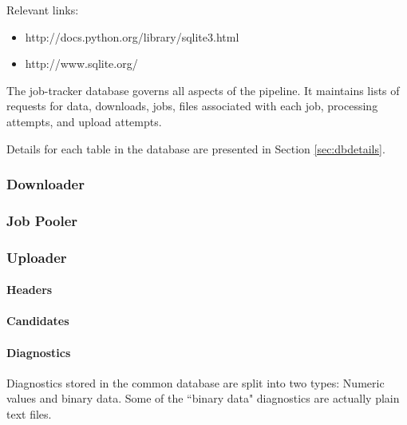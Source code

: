 Relevant links:
\begin{itemize}
    \item http://docs.python.org/library/sqlite3.html
    \item http://www.sqlite.org/
\end{itemize}

The job-tracker database governs all aspects of the pipeline. It maintains lists of requests for data, downloads, jobs, files associated with each job, processing attempts, and upload attempts.

Details for each table in the database are presented in Section \ref{sec:dbdetails}.

\subsubsection{Downloader}
\subsubsection{Job Pooler}
\subsubsection{Uploader}
\paragraph{Headers}

\paragraph{Candidates}

\paragraph{Diagnostics}
Diagnostics stored in the common database are split into two types: Numeric values and binary data. Some of the ``binary data" diagnostics are actually plain text files.

